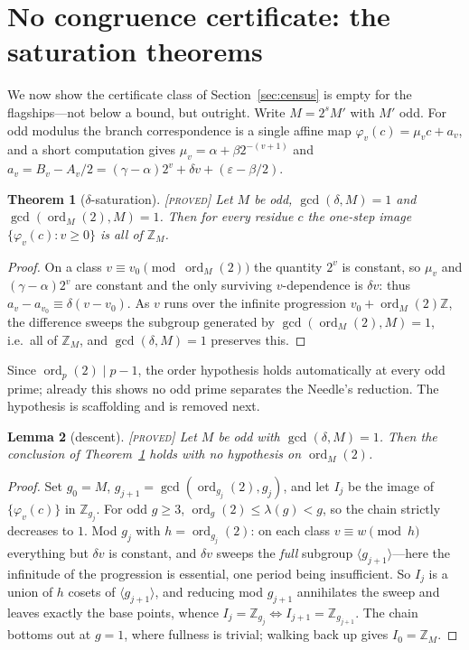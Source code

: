 \documentclass[11pt]{article}
\newtheorem{theorem}{Theorem}[section]
\newtheorem{lemma}[theorem]{Lemma}
\theoremstyle{definition}
\theoremstyle{remark}
\newcommand{\Z}{\mathbb{Z}}
\newcommand{\ord}{\operatorname{ord}}
\newcommand{\Proved}{\textsc{[proved]}}
\begin{document}
\section{No congruence certificate: the saturation theorems}
\label{sec:saturation}

We now show the certificate class of Section~\ref{sec:census} is empty for the
flagships---not below a bound, but outright.  Write $M=2^{s}M'$ with $M'$ odd.
For odd modulus the branch correspondence is a single affine map
$\varphi_v(c)=\mu_vc+a_v$, and a short computation gives
$\mu_v=\alpha+\beta 2^{-(v+1)}$ and $a_v=B_v-A_v/2=(\gamma-\alpha)2^{v}+\delta
v+(\varepsilon-\beta/2)$.

\begin{theorem}[$\delta$-saturation]\label{thm:t12}
\Proved{}\; Let $M$ be odd, $\gcd(\delta,M)=1$ and $\gcd(\ord_M(2),M)=1$.  Then
for every residue $c$ the one-step image $\{\varphi_v(c):v\ge0\}$ is all of
$\Z_M$.
\end{theorem}

\begin{proof}
On a class $v\equiv v_0 \pmod{\ord_M(2)}$ the quantity $2^{v}$ is constant, so
$\mu_v$ and $(\gamma-\alpha)2^{v}$ are constant and the only surviving
$v$-dependence is $\delta v$: thus $a_v-a_{v_0}\equiv\delta(v-v_0)$.  As $v$
runs over the infinite progression $v_0+\ord_M(2)\Z$, the difference sweeps the
subgroup generated by $\gcd(\ord_M(2),M)=1$, i.e.\ all of $\Z_M$, and
$\gcd(\delta,M)=1$ preserves this.
\end{proof}

Since $\ord_p(2)\mid p-1$, the order hypothesis holds automatically at every
odd prime; already this shows no odd prime separates the Needle's reduction.
The hypothesis is scaffolding and is removed next.

\begin{lemma}[descent]\label{lem:descent}
\Proved{}\; Let $M$ be odd with $\gcd(\delta,M)=1$.  Then the conclusion of
Theorem~\ref{thm:t12} holds with no hypothesis on $\ord_M(2)$.
\end{lemma}

\begin{proof}
Set $g_0=M$, $g_{j+1}=\gcd(\ord_{g_j}(2),g_j)$, and let $I_j$ be the image of
$\{\varphi_v(c)\}$ in $\Z_{g_j}$.  For odd $g\ge3$, $\ord_g(2)\le\lambda(g)<g$,
so the chain strictly decreases to $1$.  Mod $g_j$ with $h=\ord_{g_j}(2)$: on
each class $v\equiv w\pmod h$ everything but $\delta v$ is constant, and
$\delta v$ sweeps the \emph{full} subgroup $\langle g_{j+1}\rangle$---here the
infinitude of the progression is essential, one period being insufficient.  So
$I_j$ is a union of $h$ cosets of $\langle g_{j+1}\rangle$, and reducing mod
$g_{j+1}$ annihilates the sweep and leaves exactly the base points, whence
$I_j=\Z_{g_j}\iff I_{j+1}=\Z_{g_{j+1}}$.  The chain bottoms out at $g=1$, where
fullness is trivial; walking back up gives $I_0=\Z_M$.
\end{proof}
\end{document}

